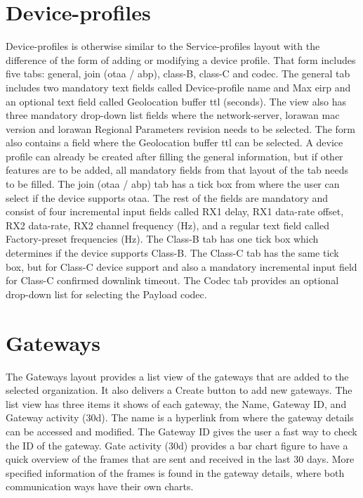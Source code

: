 \section{Device-profiles}
Device-profiles is otherwise similar to the Service-profiles layout with the difference of the form of adding or modifying a device profile.
That form includes five tabs: general, join (\gls{otaa} / \gls{abp}), class-B, class-C and codec.
The general tab includes two mandatory text fields called Device-profile name and Max \gls{eirp} and an optional text field called Geolocation buffer \gls{ttl} (seconds). The view also has three mandatory drop-down list fields where the network-server, \gls{lorawan} \gls{mac} version and \gls{lorawan} Regional Parameters revision needs to be selected.
The form also contains a field where the Geolocation buffer \gls{ttl} can be selected.
A device profile can already be created after filling the general information, but if other features are to be added, all mandatory fields from that layout of the tab needs to be filled.
The join (\gls{otaa} / \gls{abp}) tab has a tick box from where the user can select if the device supports \gls{otaa}.
The rest of the fields are mandatory and consist of four incremental input fields called RX1 delay, RX1 data-rate offset, RX2 data-rate, RX2 channel frequency (Hz), and a regular text field called Factory-preset frequencies (Hz).
The Class-B tab has one tick box which determines if the device supports Class-B.
The Class-C tab  has the same tick box, but for Class-C device support and also a mandatory incremental input field for Class-C confirmed downlink timeout.
The Codec tab provides an optional drop-down list for selecting the Payload codec.

\section{Gateways}
The Gateways layout provides a list view of the gateways that are added to the selected organization. 
It also delivers a Create button to add new gateways.
The list view has three items it shows of each gateway, the Name, Gateway ID, and Gateway activity (30d).
The name is a hyperlink from where the gateway details can be accessed and modified.
The Gateway ID gives the user a fast way to check the ID of the gateway. 
Gate activity (30d) provides a bar chart figure to have a quick overview of the frames that are sent and received in the last 30 days.
More specified information of the frames is found in the gateway details, where both communication ways have their own charts.

